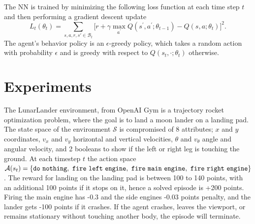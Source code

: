 \documentclass{article}
\newcommand{\cS}{\mathcal{S}}
\newcommand{\cA}{\mathcal{A}}
\newcommand{\cB}{\mathcal{B}}
\begin{document}
The NN is trained by minimizing the following loss function at each time step $t$ and then performing a gradient descent update
$$L_t(\theta_t) = \sum_{s, a, r, s' \in \cB_t}\big[r + \gamma \max_{a^\prime}Q(s^\prime, a^\prime; \theta_{t-1}) - Q(s, a; \theta_t)\big]^2.$$
The agent's behavior policy is an $\epsilon$-greedy policy, which takes a random action with probability $\epsilon$ and is greedy with respect to $Q(s_t, \cdot; \theta_t)$ otherwise.



\section{Experiments} \label{sec:experiments}
The LunarLander environment, from OpenAI Gym \cite[]{brockman2016gym} is a trajectory rocket optimization problem, where the goal is to land a moon lander on a landing pad.
The state space of the environment $\cS$ is compromised of 8 attributes; $x$ and $y$ coordinates, $v_x$ and $v_y$ horizontal and vertical velocities, $\theta$ and $v_\theta$ angle and angular velocity, and 2 booleans to show if the left or right leg is touching the ground. At each timestep $t$ the action space $\cA(s_t) = \tt\{do\ nothing,\ fire\ left\ engine,\ fire\ main\ engine,\ fire\ right\ engine\}$. The reward for landing on the landing pad is between 100 to 140 points, with an additional 100 points if it stops on it, hence a solved episode is +200 points. Firing the main engine has -0.3 and the side engines -0.03 points penalty, and the lander gets -100 points if it crashes. If the agent crashes, leaves the viewport, or remains stationary without touching another body, the episode will terminate.
\end{document}
